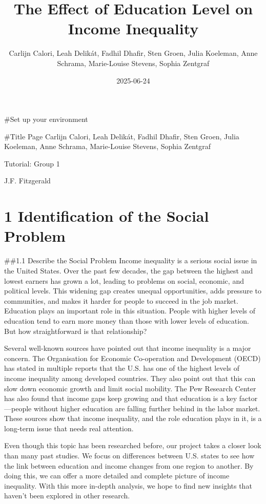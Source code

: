 \documentclass[
]{article}
\title{The Effect of Education Level on Income Inequality}
\author{Carlijn Calori, Leah Delikát, Fadhil Dhafir, Sten Groen, Julia
Koeleman, Anne Schrama, Marie-Louise Stevens, Sophia Zentgraf}
\date{2025-06-24}
\begin{document}
\maketitle

\#Set up your environment

\#Title Page Carlijn Calori, Leah Delikát, Fadhil Dhafir, Sten Groen,
Julia Koeleman, Anne Schrama, Marie-Louise Stevens, Sophia Zentgraf

Tutorial: Group 1

J.F. Fitzgerald

\section{1 Identification of the Social
Problem}\label{identification-of-the-social-problem}

\#\#1.1 Describe the Social Problem Income inequality is a serious
social issue in the United States. Over the past few decades, the gap
between the highest and lowest earners has grown a lot, leading to
problems on social, economic, and political levels. This widening gap
creates unequal opportunities, adds pressure to communities, and makes
it harder for people to succeed in the job market. Education plays an
important role in this situation. People with higher levels of education
tend to earn more money than those with lower levels of education. But
how straightforward is that relationship?

Several well-known sources have pointed out that income inequality is a
major concern. The Organisation for Economic Co-operation and
Development (OECD) has stated in multiple reports that the U.S. has one
of the highest levels of income inequality among developed countries.
They also point out that this can slow down economic growth and limit
social mobility. The Pew Research Center has also found that income gaps
keep growing and that education is a key factor---people without higher
education are falling further behind in the labor market. These sources
show that income inequality, and the role education plays in it, is a
long-term issue that needs real attention.

Even though this topic has been researched before, our project takes a
closer look than many past studies. We focus on differences between U.S.
states to see how the link between education and income changes from one
region to another. By doing this, we can offer a more detailed and
complete picture of income inequality. With this more in-depth analysis,
we hope to find new insights that haven't been explored in other
research.
\end{document}
